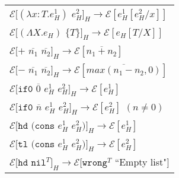 \begin{figure}[ph!]
\centering
\begin{tabular}{l}
\vspace{5pt}

$\mathscr{E}[(\lambda x:T.e_{H}^{1})$ $e_{H}^{2}]_{H}\rightarrow\mathscr{E}[e_{H}^{1}[e_{H}^{2}/x]]$ \\

\vspace{5pt}

$\mathscr{E}[(\Lambda X.e_{H})$ $\lbrace T\rbrace]_{H}\rightarrow\mathscr{E}[e_{H}[T/X]]$ \\

\vspace{5pt}

$\mathscr{E}[+$ $\overline{n_{1}}$ $\overline{n_{2}}]_{H}\rightarrow\mathscr{E}[\overline{n_{1}+n_{2}}]$ \\

\vspace{5pt}

$\mathscr{E}[-$ $\overline{n_{1}}$ $\overline{n_{2}}]_{H}\rightarrow\mathscr{E}[\overline{max(n_{1}-n_{2},0)}]$ \\

\vspace{5pt}

$\mathscr{E}[\mathtt{if0}$ $\overline{0}$ $e_{H}^{1}$ $e_{H}^{2}]_{H}\rightarrow\mathscr{E}[e_{H}^{1}]$ \\

\vspace{5pt}

$\mathscr{E}[\mathtt{if0}$ $\overline{n}$ $e_{H}^{1}$ $e_{H}^{2}]_{H}\rightarrow\mathscr{E}[e_{H}^{2}]$ $(n\neq0)$ \\

\vspace{5pt}

$\mathscr{E}[\mathtt{hd}$ $(\mathtt{cons}$ $e_{H}^{1}$ $e_{H}^{2})]_{H}\rightarrow\mathscr{E}[e_{H}^{1}]$ \\

\vspace{5pt}

$\mathscr{E}[\mathtt{tl}$ $(\mathtt{cons}$ $e_{H}^{1}$ $e_{H}^{2})]_{H}\rightarrow\mathscr{E}[e_{H}^{2}]$ \\

\vspace{5pt}

$\mathscr{E}[\mathtt{hd}$ $\mathtt{nil}^{T}]_{H}\rightarrow\mathscr{E}[\mathtt{wrong}^{T}$ ``Empty list"$]$ \\


\end{tabular}
\end{figure}
